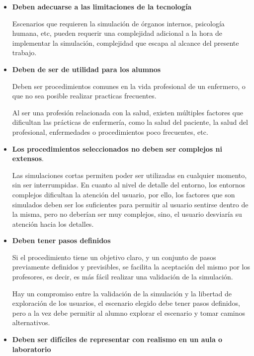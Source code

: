 \begin{itemize}

    \item \textbf{Deben adecuarse a las limitaciones de la tecnología} 

    Escenarios que requieren la simulación de órganos internos, psicología
    humana, etc, pueden requerir una complejidad adicional a la hora de
    implementar la simulación, complejidad que escapa al alcance del presente
    trabajo.

    \item \textbf{Deben de ser de utilidad para los alumnos} 
    
    Deben ser procedimientos comunes en la vida profesional de un enfermero, o
    que no sea posible realizar practicas frecuentes. 

    Al ser una profesión relacionada con la salud, existen múltiples factores
    que dificultan las prácticas de enfermería, como la salud del paciente, la
    salud del profesional, enfermedades o procedimientos poco frecuentes, etc.

\item \textbf{Los procedimientos seleccionados no deben ser complejos ni
        extensos}. 

    Las simulaciones cortas permiten poder ser utilizadas en cualquier momento,
    sin ser interrumpidas. En cuanto al nivel de detalle del entorno, los
    entornos complejos dificultan la atención del
    usuario\cite{videojuegos:gonzaleztardon}, por ello, los factores que son
    simulados deben ser los suficientes para permitir al usuario sentirse dentro
    de la misma, pero no deberían ser muy complejos, sino, el usuario desviaría su
    atención hacia los detalles.

\item \textbf{Deben tener pasos definidos}
    
    Si el procedimiento tiene un objetivo claro, y un conjunto de pasos
    previamente definidos y previsibles, se facilita la aceptación del mismo por
    los profesores, es decir, es más fácil realizar una validación de la
    simulación.

    Hay un compromiso entre la validación de la simulación y la libertad de
    exploración de los usuarios, el escenario elegido debe tener pasos
    definidos, pero a la vez debe permitir al alumno explorar el escenario y
    tomar caminos alternativos.

\item \textbf{Deben ser difíciles de representar con realismo en un aula o
        laboratorio}


\end{itemize}
